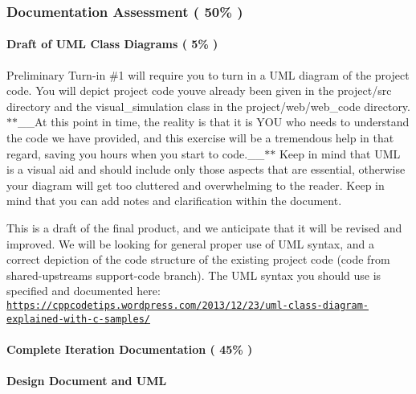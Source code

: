 \subsubsection*{Documentation Assessment ( 50\% )}

\paragraph*{Draft of U\+ML Class Diagrams ( 5\% )}

Preliminary Turn-\/in \#1 will require you to turn in a U\+ML diagram of the project code. You will depict project code you\textquotesingle{}ve already been given in the {\ttfamily project/src} directory and the visual\+\_\+simulation class in the {\ttfamily project/web/web\+\_\+code} directory. $\ast$$\ast$\+\_\+\+\_\+\+At this point in time, the reality is that it is Y\+OU who needs to understand the code we have provided, and this exercise will be a tremendous help in that regard, saving you hours when you start to code.\+\_\+\+\_\+$\ast$$\ast$ Keep in mind that U\+ML is a visual aid and should include only those aspects that are essential, otherwise your diagram will get too cluttered and overwhelming to the reader. Keep in mind that you can add notes and clarification within the document.

This is a draft of the final product, and we anticipate that it will be revised and improved. We will be looking for general proper use of U\+ML syntax, and a correct depiction of the code structure of the existing project code (code from shared-\/upstream\textquotesingle{}s support-\/code branch). The U\+ML syntax you should use is specified and documented here\+: \href{https://cppcodetips.wordpress.com/2013/12/23/uml-class-diagram-explained-with-c-samples/}{\tt https\+://cppcodetips.\+wordpress.\+com/2013/12/23/uml-\/class-\/diagram-\/explained-\/with-\/c-\/samples/}

\paragraph*{Complete Iteration Documentation ( 45\% )}

\paragraph*{Design Document and U\+ML}

